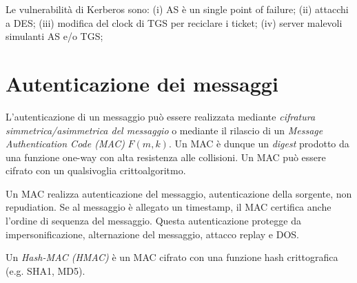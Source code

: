 Le vulnerabilità di Kerberos sono:
(i) AS è un single point of failure;
(ii) attacchi a DES;
(iii) modifica del clock di TGS per reciclare i ticket;
(iv) server malevoli simulanti AS e/o TGS;


\section{Autenticazione dei messaggi}
L'autenticazione di un messaggio può essere realizzata mediante \textit{cifratura simmetrica/asimmetrica del messaggio} o mediante il rilascio di un \textit{Message Authentication Code (MAC)} $F(m,k)$.
Un MAC è dunque un \textit{digest} prodotto da una funzione one-way con alta resistenza alle collisioni. Un MAC può essere cifrato con un qualsivoglia crittoalgoritmo.

Un MAC realizza autenticazione del messaggio, autenticazione della sorgente, non repudiation. Se al messaggio è allegato un timestamp, il MAC certifica anche l'ordine di sequenza del messaggio.
Questa autenticazione protegge da impersonificazione, alternazione del messaggio, attacco replay e DOS.

Un \textit{Hash-MAC (HMAC)} è un MAC cifrato con una funzione hash crittografica (e.g. SHA1, MD5).
